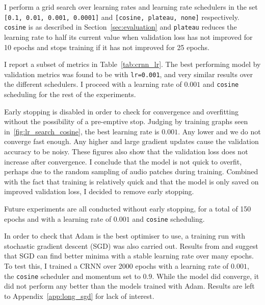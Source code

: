 I perform a grid search over learning rates and learning rate schedulers in the set \texttt{[0.1, 0.01, 0.001, 0.0001]} and \texttt{[cosine, plateau, none]} respectively. \texttt{cosine} is as described in Section~\ref{sec:evaluation} and \texttt{plateau} reduces the learning rate to half its current value when validation loss has not improved for 10 epochs and stops training if it has not improved for 25 epochs.

I report a subset of metrics in Table~\ref{tab:crnn_lr}. The best performing model by validation metrics was found to be with \texttt{lr=0.001}, and very similar results over the different schedulers. I proceed with a learning rate of $0.001$ and \texttt{cosine} scheduling for the rest of the experiments.

Early stopping is disabled in order to check for convergence and overfitting without the possibility of a pre-emptive stop. Judging by training graphs seen in~\ref{fig:lr_search_cosine}, the best learning rate is $0.001$. Any lower and we do not converge fast enough. Any higher and large gradient updates cause the validation accuracy to be noisy. These figures also show that the validation loss does not increase after convergence. I conclude that the model is not quick to overfit, perhaps due to the random sampling of audio patches during training. Combined with the fact that training is relatively quick and that the model is only saved on improved validation loss, I decided to remove early stopping. 

Future experiments are all conducted without early stopping, for a total of 150 epochs and with a learning rate of $0.001$ and \texttt{cosine} scheduling.

In order to check that Adam is the best optimiser to use, a training run with stochastic gradient descent (SGD) was also carried out. Results from \citet{SGD1} and \citet{SGD2} suggest that SGD can find better minima with a stable learning rate over many epochs. To test this, I trained a CRNN over 2000 epochs with a learning rate of $0.001$, the \texttt{cosine} scheduler and momentum set to $0.9$. While the model did converge, it did not perform any better than the models trained with Adam. Results are left to Appendix~\ref{app:long_sgd} for lack of interest.

